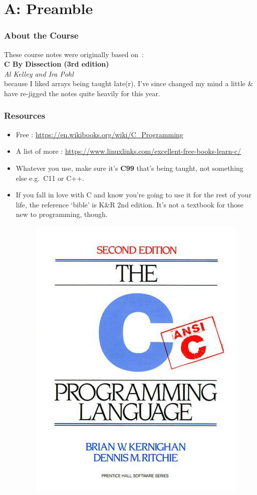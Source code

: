 \section{A: Preamble}

\begin{frame}%
\frametitle{About the Course}
%
These course notes were originally based on~:\\[1em]
{\bf C By Dissection (3rd edition)}\\
{\it Al Kelley and Ira Pohl}\\[1em]

because I liked arrays being taught late(r).
I've since changed my mind a little \& have re-jigged the notes quite heavily for this year.
\end{frame}

\begin{frame}%
\frametitle{Resources}
\begin{itemize}[<+->]
\item Free : \url{https://en.wikibooks.org/wiki/C_Programming}
\item A list of more : \url{https://www.linuxlinks.com/excellent-free-books-learn-c/}
\item Whatever you use, make sure it's {\bf C99} that's being taught, not something else e.g.\ C11 or C++.
\item If you fall in love with C and  know you're going to use it for the rest of your life, the reference `bible' is K\&R 2nd edition.
It's not a textbook for those new to programming, though.
\begin{figure}[h]
\centerline{
\includegraphics[scale=0.25]{../Figs/9780131103627.jpg}
}
\end{figure}
\end{itemize}
\end{frame}

